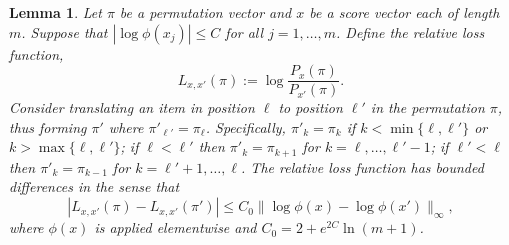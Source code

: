 \documentclass{article}
\newtheorem{lemma}{Lemma}
\begin{document}
\begin{lemma}
\label{lem:bdd_diffs}
Let $\pi$ be a permutation vector and $x$ be a score vector each of length $m$.
Suppose that $|\log \phi(x_j)| \le C$ for all $j=1,\ldots, m$. 
Define the relative loss function,
$$
L_{x,x'}(\pi) := \log \frac{P_{x}(\pi)}{P_{x'}(\pi)}.
$$
Consider translating an item in position $\ell$ to position $\ell'$ in the permutation $\pi$, thus forming $\pi'$ where $\pi'_{\ell'} = \pi_\ell$.
Specifically,
$\pi'_k = \pi_k$ if $k < \min\{\ell,\ell'\}$ or $k > \max\{\ell,\ell'\}$;
if $\ell < \ell'$ then $\pi'_k = \pi_{k+1}$ for $k=\ell,\ldots,\ell'-1$;
if $\ell' < \ell$ then $\pi'_k = \pi_{k-1}$ for $k=\ell'+1,\ldots,\ell$.
The relative loss function has bounded differences in the sense that
$$
|L_{x,x'}(\pi) - L_{x,x'}(\pi')| \le C_0 \|\log \phi(x) - \log \phi(x') \|_\infty,
$$
where $\phi(x)$ is applied elementwise and $C_0 = 2 + e^{2C} \ln(m+1)$.
\end{lemma}
\end{document}
